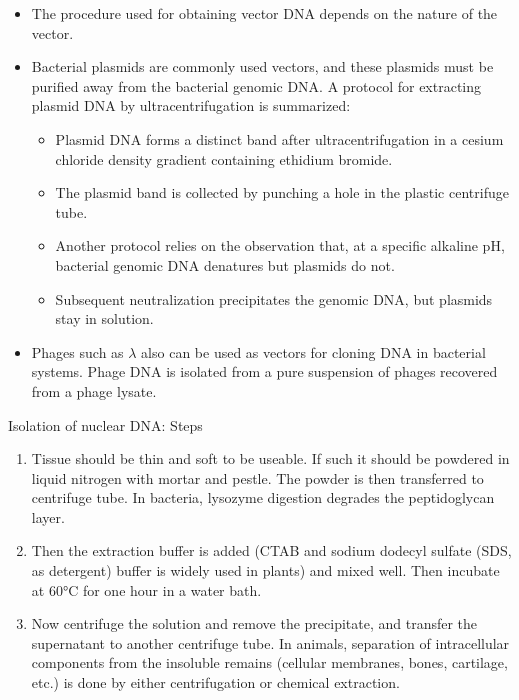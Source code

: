 \documentclass[11pt,dvipsnames,ignorenonframetext,aspectratio=169]{beamer}
\providecommand{\tightlist}{%
  \setlength{\itemsep}{0pt}\setlength{\parskip}{0pt}}
\begin{document}
\begin{frame}{}
\protect\hypertarget{section-7}{}

\begin{itemize}
\tightlist
\item
  The procedure used for obtaining vector DNA depends on the nature of
  the vector.
\item
  Bacterial plasmids are commonly used vectors, and these plasmids must
  be purified away from the bacterial genomic DNA. A protocol for
  extracting plasmid DNA by ultracentrifugation is summarized:

  \begin{itemize}
  \tightlist
  \item
    Plasmid DNA forms a distinct band after ultracentrifugation in a
    cesium chloride density gradient containing ethidium bromide.
  \item
    The plasmid band is collected by punching a hole in the plastic
    centrifuge tube.
  \item
    Another protocol relies on the observation that, at a specific
    alkaline pH, bacterial genomic DNA denatures but plasmids do not.
  \item
    Subsequent neutralization precipitates the genomic DNA, but plasmids
    stay in solution.
  \end{itemize}
\item
  Phages such as \(\lambda\) also can be used as vectors for cloning DNA
  in bacterial systems. Phage DNA is isolated from a pure suspension of
  phages recovered from a phage lysate.
\end{itemize}

\end{frame}

\begin{frame}{Isolation of nuclear DNA: Steps}
\protect\hypertarget{isolation-of-nuclear-dna-steps}{}

\begin{enumerate}
\tightlist
\item
  Tissue should be thin and soft to be useable. If such it should be
  powdered in liquid nitrogen with mortar and pestle. The powder is then
  transferred to centrifuge tube. In bacteria, lysozyme digestion
  degrades the peptidoglycan layer.
\item
  Then the extraction buffer is added (CTAB and sodium dodecyl sulfate
  (SDS, as detergent) buffer is widely used in plants) and mixed well.
  Then incubate at 60°C for one hour in a water bath.
\item
  Now centrifuge the solution and remove the precipitate, and transfer
  the supernatant to another centrifuge tube. In animals, separation of
  intracellular components from the insoluble remains (cellular
  membranes, bones, cartilage, etc.) is done by either centrifugation or
  chemical extraction.
\end{enumerate}

\end{frame}
\end{document}
